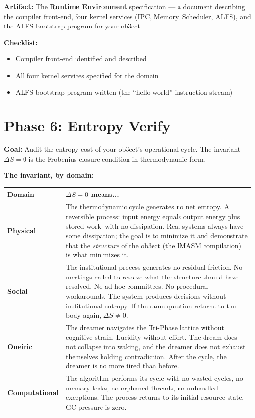 \documentclass[12pt,a4paper]{article}
\begin{document}
{\bf Artifact:} The \textbf{Runtime Environment} specification — a document
describing the compiler front-end, four kernel services (IPC, Memory, Scheduler, ALFS),
and the ALFS bootstrap program for your ob3ect.

{\bf Checklist:}
\begin{itemize}
\item[ ] Compiler front-end identified and described
\item[ ] All four kernel services specified for the domain
\item[ ] ALFS bootstrap program written (the ``hello world'' instruction stream)
\end{itemize}

\section{Phase 6: Entropy Verify}

{\bf Goal:} Audit the entropy cost of your ob3ect's operational cycle. The invariant
$\Delta S = 0$ is the Frobenius closure condition in thermodynamic form.

{\bf The invariant, by domain:}

{\small
\begin{tabularx}{\textwidth}{>{\bfseries}p{2.5cm} >{\raggedright\arraybackslash}p{10cm}}
\toprule
{\bf Domain} & {\bf $\Delta S = 0$ means...} \\
\midrule
Physical & The thermodynamic cycle generates no net entropy. A reversible process:
    input energy equals output energy plus stored work, with no dissipation.
    Real systems always have some dissipation; the goal is to minimize it and
    demonstrate that the \emph{structure} of the ob3ect (the IMASM compilation)
    is what minimizes it. \\
Social & The institutional process generates no residual friction. No meetings
    called to resolve what the structure should have resolved. No ad-hoc committees.
    No procedural workarounds. The system produces decisions without institutional
    entropy. If the same question returns to the body again, $\Delta S \neq 0$. \\
Oneiric & The dreamer navigates the Tri-Phase lattice without cognitive strain.
    Lucidity without effort. The dream does not collapse into waking, and the
    dreamer does not exhaust themselves holding contradiction. After the cycle,
    the dreamer is no more tired than before. \\
Computational & The algorithm performs its cycle with no wasted cycles, no
    memory leaks, no orphaned threads, no unhandled exceptions. The process
    returns to its initial resource state. GC pressure is zero. \\
\bottomrule
\end{tabularx}
}
\end{document}

